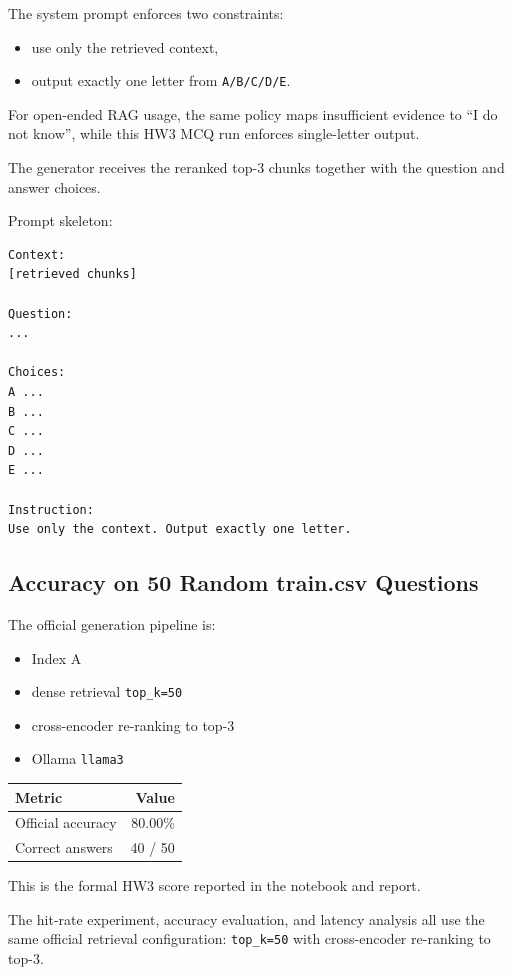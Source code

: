 \documentclass[12pt,a4paper]{article}
\begin{document}
The system prompt enforces two constraints:

\begin{itemize}
    \item use only the retrieved context,
    \item output exactly one letter from \texttt{A/B/C/D/E}.
\end{itemize}

For open-ended RAG usage, the same policy maps insufficient evidence to ``I do not know'', while this HW3 MCQ run enforces single-letter output.

The generator receives the reranked top-3 chunks together with the question and answer choices.

Prompt skeleton:
\begin{verbatim}
Context:
[retrieved chunks]

Question:
...

Choices:
A ...
B ...
C ...
D ...
E ...

Instruction:
Use only the context. Output exactly one letter.
\end{verbatim}

\subsection{Accuracy on 50 Random train.csv Questions}

The official generation pipeline is:

\begin{itemize}
    \item Index A
    \item dense retrieval \texttt{top\_k=50}
    \item cross-encoder re-ranking to top-3
    \item Ollama \texttt{llama3}
\end{itemize}

\begin{table}[H]
\centering
\begin{tabular}{lr}
\toprule
\textbf{Metric} & \textbf{Value} \\
\midrule
Official accuracy & 80.00\% \\
Correct answers & 40 / 50 \\
\bottomrule
\end{tabular}
\end{table}

This is the formal HW3 score reported in the notebook and report.

The hit-rate experiment, accuracy evaluation, and latency analysis all use the same official retrieval configuration: \texttt{top\_k=50} with cross-encoder re-ranking to top-3.
\end{document}
